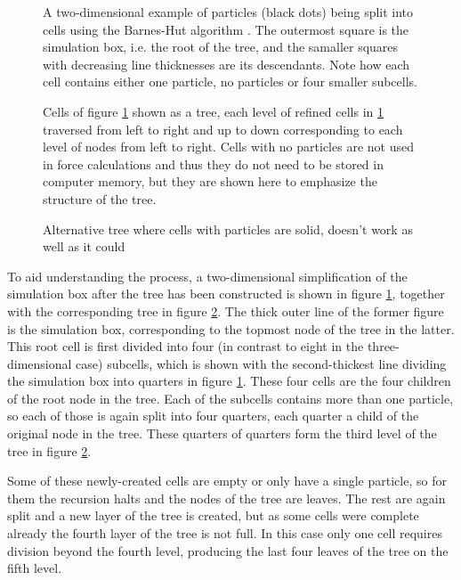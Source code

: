 \documentclass[english, oneside]{HYgradu}
\begin{document}
\begin{figure}
    \centering
    
    \caption{A two-dimensional example of particles (black dots) being split into cells using the Barnes-Hut algorithm \citep{barnes1986hierarchical}. The outermost square is the simulation box, i.e. the root of the tree, and the samaller squares with decreasing line thicknesses are its descendants. Note how each cell contains either one particle, no particles or four smaller subcells.}\label{fig:tree-box}
\end{figure}
\begin{figure}
    \centering
    \def\svgwidth{\columnwidth}
    
    \caption{Cells of figure \ref{fig:tree-box} shown as a tree, each level of refined cells in \ref{fig:tree-box} traversed from left to right and up to down corresponding to each level of nodes from left to right. Cells with no particles are not used in force calculations and thus they do not need to be stored in computer memory, but they are shown here to emphasize the structure of the tree.}\label{fig:tree}
\end{figure}
\begin{figure}
    \centering
    \def\svgwidth{\columnwidth}
    
    \caption{Alternative tree where cells with particles are solid, doesn't work as well as it could}\label{fig:tree-solids}
\end{figure}

To aid understanding the process, a two-dimensional simplification of the simulation box after the tree has been constructed is shown in figure \ref{fig:tree-box}, together with the corresponding tree in figure \ref{fig:tree}. The thick outer line of the former figure is the simulation box, corresponding to the topmost node of the tree in the latter. This root cell is first divided into four (in contrast to eight in the three-dimensional case) subcells, which is shown with the second-thickest line dividing the simulation box into quarters in figure \ref{fig:tree-box}. These four cells are the four children of the root node in the tree. Each of the subcells contains more than one particle, so each of those is again split into four quarters, each quarter a child of the original node in the tree. These quarters of quarters form the third level of the tree in figure \ref{fig:tree}.

Some of these newly-created cells are empty or only have a single particle, so for them the recursion halts and the nodes of the tree are leaves. The rest are again split and a new layer of the tree is created, but as some cells were complete already the fourth layer of the tree is not full. In this case only one cell requires division beyond the fourth level, producing the last four leaves of the tree on the fifth level.
\end{document}
